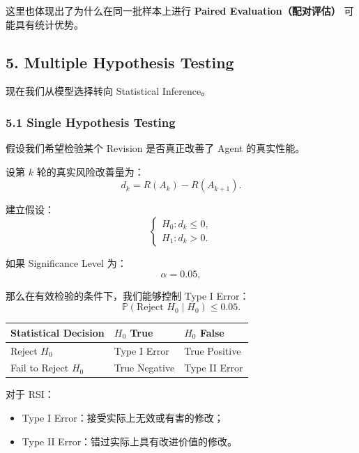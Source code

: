 这里也体现出了为什么在同一批样本上进行 \textbf{Paired Evaluation（配对评估）} 可能具有统计优势。

\hypertarget{part-2-16-0001-multiple-hypothesis-testing}{%
\subsection{5. Multiple Hypothesis Testing}\label{part-2-16-0001-multiple-hypothesis-testing}}

现在我们从模型选择转向 Statistical Inference。

\hypertarget{part-2-16-0001-single-hypothesis-testing}{%
\subsubsection{5.1 Single Hypothesis Testing}\label{part-2-16-0001-single-hypothesis-testing}}

假设我们希望检验某个 Revision 是否真正改善了 Agent 的真实性能。

设第 \(k\) 轮的真实风险改善量为：
\[d_k=R(A_k)-R(A_{k+1}).\]

建立假设：
\[\begin{cases}
H_0:d_k\leq0,\\
H_1:d_k>0.
\end{cases}\]

如果 Significance Level 为：
\[\alpha=0.05,\]

那么在有效检验的条件下，我们能够控制 Type I Error：
\[\mathbb P(\text{Reject }H_0\mid H_0)
\leq0.05.\]

\begin{readertable}
\begin{longtable}[]{@{}
  >{\raggedright\arraybackslash}p{}
  >{\raggedright\arraybackslash}p{}
  >{\raggedright\arraybackslash}p{}@{}}
\toprule
Statistical Decision & \(H_0\) True & \(H_0\) False \\
\midrule
\endhead
Reject \(H_0\) & Type I Error & True Positive \\
Fail to Reject \(H_0\) & True Negative & Type II Error \\
\bottomrule
\end{longtable}
\end{readertable}

对于 RSI：

\begin{itemize}
\tightlist
\item
  Type I Error：接受实际上无效或有害的修改；
\item
  Type II Error：错过实际上具有改进价值的修改。
\end{itemize}

